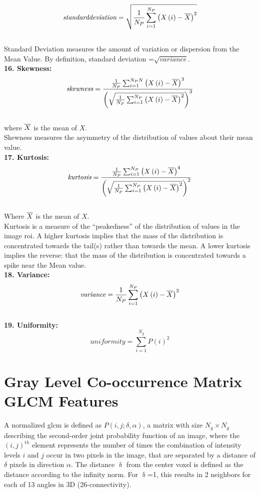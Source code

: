 \[\textit{standarddeviation}=\sqrt{\frac{1}{N_{P}}\sum _{i=1}^{N_{P}}\left(X\left(i\right)-\overline{X}\right)^{2}}\]\\
{Standard Deviation measures the amount of variation or dispersion from the Mean Value. By definition, standard deviation =}$\sqrt{\textit{variance}}$.\\
{\textbf{16. Skewness:}}
\[\textit{skewness}=\frac{\frac{1}{N_{P}}\sum _{i=1}^{N_{P}N}\left(X\left(i\right)-\overline{X}\right)^{3}}{\left(\sqrt{\frac{1}{N_{P}}\sum _{i=1}^{N_{P}}\left(X\left(i\right)-\overline{X}\right)^{2}}\right)^{3}}\]\\
{where } $\overline{X}${ is the mean of} $X$.\\
Skewness measures the asymmetry of the distribution of values about their mean value.\\
\textbf{17. Kurtosis:}\\
\[\textit{kurtosis}=\frac{\frac{1}{N_{P}}\sum _{i=1}^{N_{P}}\left(X\left(i\right)-\overline{X}\right)^{4}}{\left(\sqrt{\frac{1}{N_{P}}\sum _{i=1}^{N_{P}}\left(X\left(i\right)-\overline{X}\right)^{2}}\right)^{2}}\]\\
{Where } $\overline{X}${ is the mean of} $X$.\\
{Kurtosis is a measure of the “peakedness” of the distribution of values in the image \ac{roi}. A higher kurtosis implies that the mass of the distribution is concentrated towards the tail(s) rather than towards the mean. A lower kurtosis implies the reverse: that the mass of the distribution is concentrated towards a spike near the Mean value.}\\
{\textbf{18. Variance:}}\\
\[\textit{variance}=\frac{1}{N_{P}}\sum _{i=1}^{N_{P}}\left(X\left(i\right)-\overline{X}\right)^{2}\]\\
\textbf{19. Uniformity:}\\
\[\textit{uniformity}=\sum _{i=1}^{N_{g}}P\left(i\right)^{2}\]



\section{Gray Level Co-occurrence Matrix GLCM Features}

A normalized \ac{glcm} is defined as $P\left(i,j;\delta ,\alpha \right)$, a matrix with size $N_{g}\times N_{g}$ describing the second-order joint probability function of an image, where the $\left(i,j\right)^{th}$ element represents the number of times the combination of intensity levels $i$ and $j$ occur in two pixels in the image, that are separated by a distance of $\delta $ pixels in direction $\alpha $. The distance $\updelta$ from the center voxel is defined as the distance according to the infinity norm. For $\updelta$=1, this results in 2 neighbors for each of 13 angles in 3D (26-connectivity).

